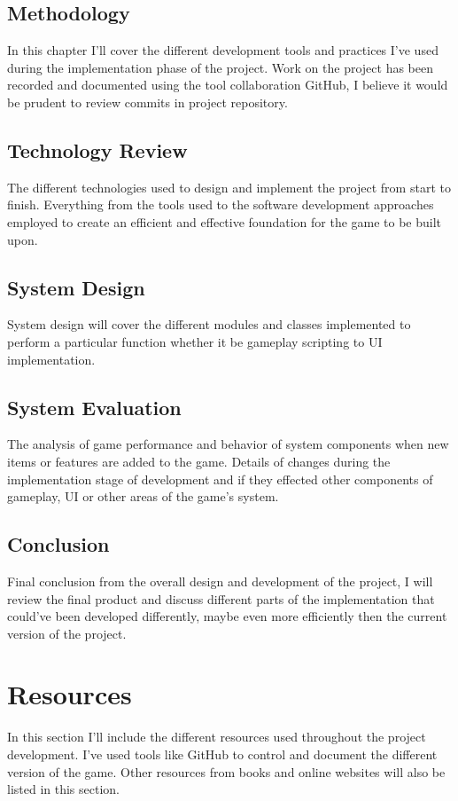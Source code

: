 \subsection{Methodology}
In this chapter I'll cover the different development tools and practices I've used during the implementation phase of the project. Work on the project has been recorded and documented using the tool collaboration GitHub, I believe it would be prudent to review commits in project repository.

\subsection{Technology Review}
The different technologies used to design and implement the project from start to finish. Everything from the tools used to the software development approaches employed to create an efficient and effective foundation for the game to be built upon.
\subsection{System Design}
System design will cover the different modules and classes implemented to perform a particular function whether it be gameplay scripting to UI implementation.
\subsection{System Evaluation}
The analysis of game performance and behavior of system components when new items or features are added to the game. Details of changes during the implementation stage of development and if they effected other components of gameplay, UI or other areas of the game's system.
\subsection{Conclusion}
Final conclusion from the overall design and development of the project, I will review the final product and discuss different parts of the implementation that could've been developed differently, maybe even more efficiently then the current version of the project.
\section{Resources}
In this section I'll include the different resources used throughout the project development. I've used tools like GitHub to control and document the different version of the game. Other resources from books and online websites will also be listed in this section.

